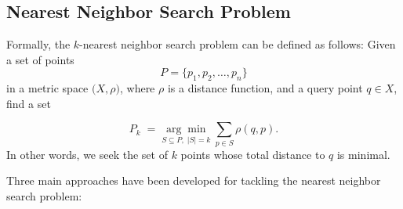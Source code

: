 \documentclass{article}
\begin{document}

\subsection{Nearest Neighbor Search Problem}

Formally, the \(k\)-nearest neighbor search problem can be defined as follows:
Given a set of points
\[
P = \{p_1, p_2, \dots, p_n\}
\]
in a metric space \(\bigl(X, \rho\bigr)\), where \(\rho\) is a distance function, and a query point \(q \in X\), find a set

\[
P_k 
\;=\;
\underset{S \subseteq P,\;|S|=k}{\arg\min}
\;\sum_{p \in S} \rho(q, p)
.
\]
In other words, we seek the set of $k$ points whose total distance to $q$ is minimal.


Three main approaches have been developed for tackling the nearest neighbor search problem:
\end{document}
